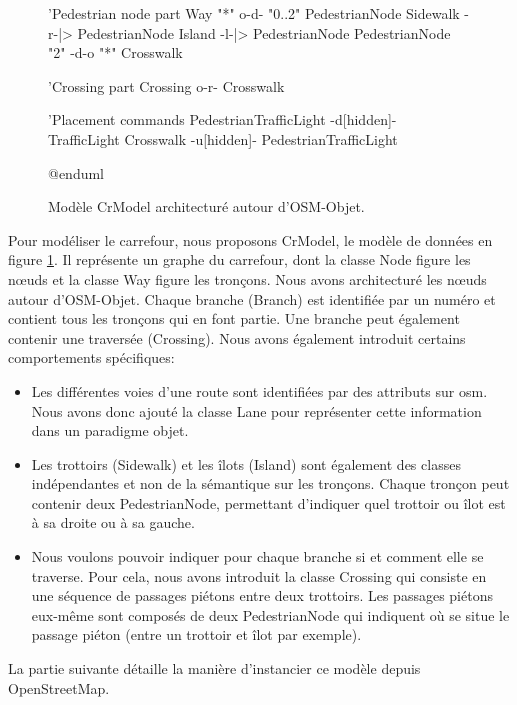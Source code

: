 \begin{figure}
\begin{plantuml}
        'Pedestrian node part
        Way "*" o-d- "0..2" PedestrianNode
        Sidewalk -r-|> PedestrianNode
        Island -l-|> PedestrianNode
        PedestrianNode "2" -d-o "*" Crosswalk

        'Crossing part
        Crossing o-r- Crosswalk

        'Placement commands
        PedestrianTrafficLight -d[hidden]- TrafficLight
        Crosswalk -u[hidden]- PedestrianTrafficLight

        @enduml 
    \end{plantuml}
    \caption[Modèle CrModel.]{Modèle CrModel architecturé autour d'OSM-Objet.}
    \label{fig:modelisation_crmodel}
\end{figure}

Pour modéliser le carrefour, nous proposons CrModel, le modèle de données en figure \ref{fig:modelisation_crmodel}. Il représente un graphe du carrefour, dont la classe Node figure les nœuds et la classe Way figure les tronçons. Nous avons architecturé les nœuds autour d'OSM-Objet. Chaque branche (Branch) est identifiée par un numéro et contient tous les tronçons qui en font partie. Une  branche peut également contenir une traversée (Crossing). Nous avons également introduit certains comportements spécifiques:

\begin{itemize}
    \item Les différentes voies d'une route sont identifiées par des attributs sur \gls{osm}. Nous avons donc ajouté la classe Lane pour représenter cette information dans un paradigme objet.
    \item Les trottoirs (Sidewalk) et les îlots (Island) sont également des classes indépendantes et non de la sémantique sur les tronçons. Chaque tronçon peut contenir deux PedestrianNode, permettant d'indiquer quel trottoir ou îlot est à sa droite ou à sa gauche.
    \item Nous voulons pouvoir indiquer pour chaque branche si et comment elle se traverse. Pour cela, nous avons introduit la classe Crossing qui consiste en une séquence de passages piétons entre deux trottoirs. Les passages piétons eux-même sont composés de deux PedestrianNode qui indiquent où se situe le passage piéton (entre un trottoir et îlot par exemple).
\end{itemize}

\newpar{}

La partie suivante détaille la manière d'instancier ce modèle depuis OpenStreetMap.

